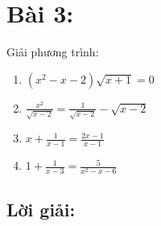 \documentclass[13pt, a4paper, titlepage]{report}
\begin{document}
%
\section*{Bài 3:}
Giải phương trình:
\begin{enumerate}[label=(\alph*)]
\item $(x^2 - x - 2)\sqrt{x+1} = 0$
\item $\frac{x^2}{\sqrt{x-2}}=\frac{1}{\sqrt{x-2}} - \sqrt{x-2}$
\item $x + \frac{1}{x-1} = \frac{2x-1}{x-1}$
\item $1 + \frac{1}{x-3} = \frac{5}{x^2-x-6}$
\end{enumerate}

\subsection*{Lời giải:}
\end{document}
